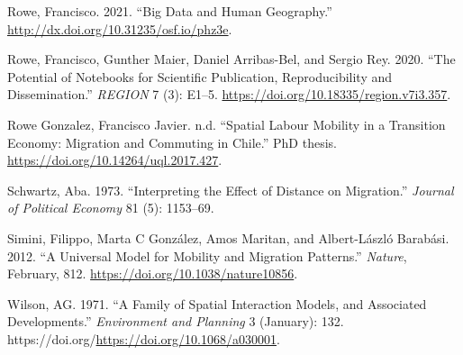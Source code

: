 \documentclass[11pt,letterpaper]{article}
\newlength{\cslhangindent}
\newlength{\cslentryspacingunit} %
\newenvironment{CSLReferences}[2] %
 {%
  \setlength{\parindent}{0pt}
  \ifodd #1
  \let\oldpar\par
  \def\par{\hangindent=\cslhangindent\oldpar}
  \fi
  \setlength{\parskip}{#2\cslentryspacingunit}
 }%
 {}
\begin{document}
\begin{CSLReferences}{1}{0}
\leavevmode{}%
Rowe, Francisco. 2021. {``Big Data and Human Geography.''} \url{http://dx.doi.org/10.31235/osf.io/phz3e}.

\leavevmode{}%
Rowe, Francisco, Gunther Maier, Daniel Arribas-Bel, and Sergio Rey. 2020. {``The Potential of Notebooks for Scientific Publication, Reproducibility and Dissemination.''} \emph{REGION} 7 (3): E1--5. \url{https://doi.org/10.18335/region.v7i3.357}.

\leavevmode{}%
Rowe Gonzalez, Francisco Javier. n.d. {``Spatial Labour Mobility in a Transition Economy: Migration and Commuting in Chile.''} PhD thesis. \url{https://doi.org/10.14264/uql.2017.427}.

\leavevmode{}%
Schwartz, Aba. 1973. {``Interpreting the Effect of Distance on Migration.''} \emph{Journal of Political Economy} 81 (5): 1153--69.

\leavevmode{}%
Simini, Filippo, Marta C González, Amos Maritan, and Albert-László Barabási. 2012. {``A Universal Model for Mobility and Migration Patterns.''} \emph{Nature}, February, 812. \url{https://doi.org/10.1038/nature10856}.

\leavevmode{}%
Wilson, AG. 1971. {``A Family of Spatial Interaction Models, and Associated Developments.''} \emph{Environment and Planning} 3 (January): 132. https://doi.org/\url{https://doi.org/10.1068/a030001}.

\end{CSLReferences}




\setlength{\bibsep}{0.00cm plus 0.05cm} %


\end{document}

